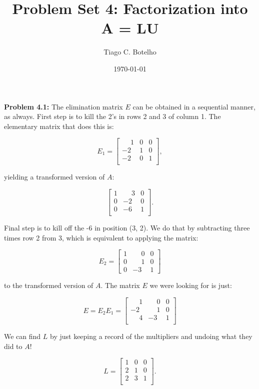 \documentclass{article}
\title{Problem Set 4: Factorization into A = LU}
\author{Tiago C. Botelho}
\date{\today}
\begin{document}
\maketitle

\noindent \textbf{Problem 4.1:} The elimination matrix $E$ can be obtained in a sequential manner, as always. First step is to kill the 2's in rows 2 and 3 of column 1. The elementary matrix that does this is:

\[
E_1 = \begin{bmatrix}
\phantom{-}1 & 0 & 0\\
-2 & 1 & 0\\
-2 & 0 & 1\\
\end{bmatrix},
\]

yielding a transformed version of $A$:

\[
\begin{bmatrix}
1 & \phantom{-}3 & 0\\
0 & -2 & 0\\
0 & -6 & 1\\
\end{bmatrix}.
\]

Final step is to kill off the -6 in position (3, 2). We do that by subtracting three times row 2 from 3, which is equivalent to applying the matrix:

\[
E_2 = \begin{bmatrix}
1 & \phantom{-}0 & 0\\
0 & \phantom{-}1 & 0\\
0 & -3 & 1
\end{bmatrix}
\]

to the transformed version of $A$. The matrix $E$ we were looking for is just:

\[
E = E_2E_1 = \begin{bmatrix}
\phantom{-}1 & \phantom{-}0 & 0\\
-2 & \phantom{-}1 & 0\\
\phantom{-}4 & -3 & 1\\
\end{bmatrix}
\]

We can find $L$ by just keeping a record of the multipliers and undoing what they did to $A$!

\[
L = \begin{bmatrix}
1 & 0 & 0\\
2 & 1 & 0\\
2 & 3 & 1\\
\end{bmatrix}.
\]
\end{document}
